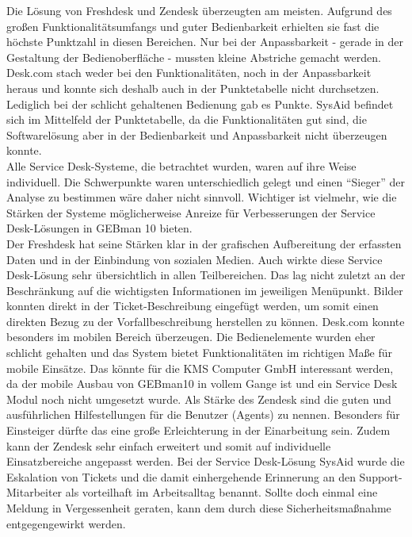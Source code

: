 \noindent
Die Lösung von Freshdesk und Zendesk überzeugten am meisten. Aufgrund des großen Funktionalitätsumfangs und guter Bedienbarkeit erhielten sie fast die höchste Punktzahl in diesen Bereichen. Nur bei der Anpassbarkeit - gerade in der Gestaltung der Bedienoberfläche - mussten kleine Abstriche gemacht werden.\newline
Desk.com stach weder bei den Funktionalitäten, noch in der Anpassbarkeit heraus und konnte sich deshalb auch in der Punktetabelle nicht durchsetzen. Lediglich bei der schlicht gehaltenen Bedienung gab es Punkte.\newline
SysAid befindet sich im Mittelfeld der Punktetabelle, da die Funktionalitäten gut sind, die Softwarelösung aber in der Bedienbarkeit und Anpassbarkeit nicht überzeugen konnte.\\


\noindent
Alle Service Desk-Systeme, die betrachtet wurden, waren auf ihre Weise individuell. Die Schwerpunkte waren unterschiedlich gelegt und einen \enquote{Sieger} der Analyse zu bestimmen wäre daher nicht sinnvoll. Wichtiger ist vielmehr, wie die Stärken der Systeme möglicherweise Anreize für Verbesserungen der Service Desk-Lösungen in GEBman 10 bieten.\\

\noindent
Der Freshdesk hat seine Stärken klar in der grafischen Aufbereitung der erfassten Daten und in der Einbindung von sozialen Medien. Auch wirkte diese Service Desk-Lösung sehr übersichtlich in allen Teilbereichen. Das lag nicht zuletzt an der Beschränkung auf die wichtigsten Informationen im jeweiligen Menüpunkt. Bilder konnten direkt in der Ticket-Beschreibung eingefügt werden, um somit einen direkten Bezug zu der Vorfallbeschreibung herstellen zu können.
\newline
Desk.com konnte besonders im mobilen Bereich überzeugen. Die Bedienelemente wurden eher schlicht gehalten und das System bietet Funktionalitäten im richtigen Maße für mobile Einsätze. Das könnte für die KMS Computer GmbH interessant werden, da der mobile Ausbau von GEBman10 in vollem Gange ist und ein Service Desk Modul noch nicht umgesetzt wurde. \newline
Als Stärke des Zendesk sind die guten und ausführlichen Hilfestellungen für die Benutzer (Agents) zu nennen. Besonders für Einsteiger dürfte das eine große Erleichterung in der Einarbeitung sein. Zudem kann der Zendesk sehr einfach erweitert und somit auf individuelle Einsatzbereiche angepasst werden. \newline
Bei der Service Desk-Lösung SysAid wurde die Eskalation von Tickets und die damit einhergehende Erinnerung an den Support-Mitarbeiter als vorteilhaft im Arbeitsalltag benannt. Sollte doch einmal eine Meldung in Vergessenheit geraten, kann dem durch diese Sicherheitsmaßnahme entgegengewirkt werden.\\\\

